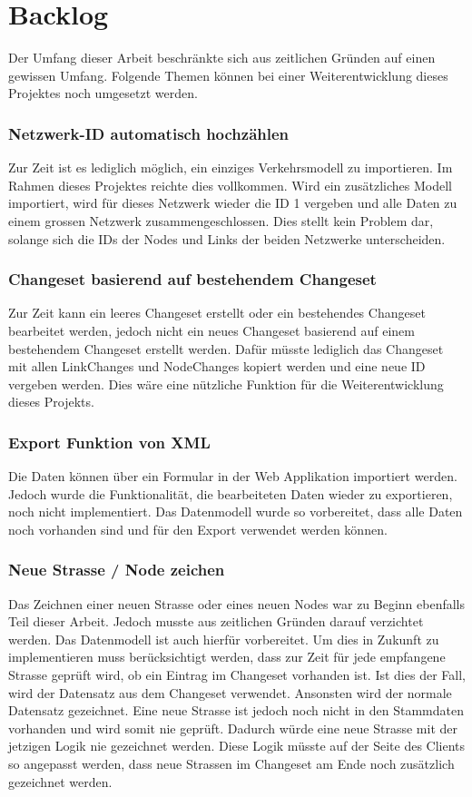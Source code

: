 \section{Backlog}
Der Umfang dieser Arbeit beschränkte sich aus zeitlichen Gründen auf einen gewissen Umfang. Folgende Themen können bei einer Weiterentwicklung dieses Projektes noch umgesetzt werden.
\subsubsection*{Netzwerk-ID automatisch hochzählen}
Zur Zeit ist es lediglich möglich, ein einziges Verkehrsmodell zu importieren. Im Rahmen dieses Projektes reichte dies vollkommen. Wird ein zusätzliches Modell importiert, wird für dieses Netzwerk wieder die ID 1 vergeben und alle Daten zu einem grossen Netzwerk zusammengeschlossen. Dies stellt kein Problem dar, solange sich die IDs der Nodes und Links der beiden Netzwerke unterscheiden.
\subsubsection*{Changeset basierend auf bestehendem Changeset}
Zur Zeit kann ein leeres Changeset erstellt oder ein bestehendes Changeset bearbeitet werden, jedoch nicht ein neues Changeset basierend auf einem bestehendem Changeset erstellt werden. Dafür müsste lediglich das Changeset mit allen Link\textunderscore Changes und Node\textunderscore Changes kopiert werden und eine neue ID vergeben werden. Dies wäre eine nützliche Funktion für die Weiterentwicklung dieses Projekts.
\subsubsection*{Export Funktion von XML}
Die Daten können über ein Formular in der Web Applikation importiert werden. Jedoch wurde die Funktionalität, die bearbeiteten Daten wieder zu exportieren, noch nicht implementiert. Das Datenmodell wurde so vorbereitet, dass alle Daten noch vorhanden sind und für den Export verwendet werden können.
\subsubsection*{Neue Strasse / Node zeichen}
Das Zeichnen einer neuen Strasse oder eines neuen Nodes war zu Beginn ebenfalls Teil dieser Arbeit. Jedoch musste aus zeitlichen Gründen darauf verzichtet werden. Das Datenmodell ist auch hierfür vorbereitet. Um dies in Zukunft zu implementieren muss berücksichtigt werden, dass zur Zeit für jede empfangene Strasse geprüft wird, ob ein Eintrag im Changeset vorhanden ist. Ist dies der Fall, wird der Datensatz aus dem Changeset verwendet. Ansonsten wird der normale Datensatz gezeichnet. Eine neue Strasse ist jedoch noch nicht in den Stammdaten vorhanden und wird somit nie geprüft. Dadurch würde eine neue Strasse mit der jetzigen Logik nie gezeichnet werden. Diese Logik müsste auf der Seite des Clients so angepasst werden, dass neue Strassen im Changeset am Ende noch zusätzlich gezeichnet werden.
